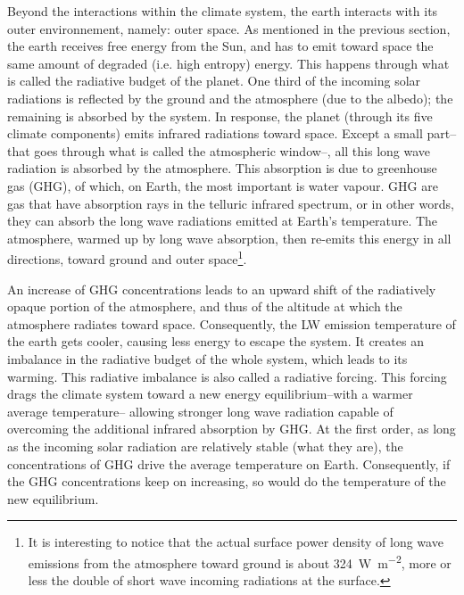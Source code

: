 
Beyond the interactions within the climate system, the earth interacts with its outer environnement, namely: outer space. As mentioned in the previous section, the earth receives free energy from the Sun, and has to emit toward space the same amount of degraded (i.e. high entropy) energy.
This happens through what is called the radiative budget of the planet.
One third of the incoming solar radiations is reflected by the ground and the atmosphere (due to the albedo); the remaining is absorbed by the system. 
In response, the planet (through its five climate components) emits infrared radiations toward space. Except a small part\---that goes through what is called the atmospheric window\---, all this long wave radiation is absorbed by the atmosphere.
This absorption is due to greenhouse gas (GHG), of which, on Earth, the most important is water vapour. GHG are gas that have absorption rays in the telluric infrared spectrum, or in other words, they can absorb the long wave radiations emitted at Earth's temperature.
The atmosphere, warmed up by long wave absorption, then re-emits this energy in all directions, toward ground and outer space\footnote{It is interesting to notice that the actual surface power density of long wave emissions from the atmosphere toward ground is about \SI{324}{\watt\per\square\meter}, more or less the double of short wave incoming radiations at the surface.}.

An increase of GHG concentrations leads to an upward shift of the radiatively opaque portion of the atmosphere, and thus of the altitude at which the atmosphere radiates toward space. Consequently, the LW emission temperature of the earth gets cooler, causing less energy to escape the system. It creates an imbalance in the radiative budget of the whole system, which leads to its warming. This radiative imbalance is also called a radiative forcing.  %
This forcing drags the climate system toward a new energy equilibrium\---with a warmer average temperature\--- allowing stronger long wave radiation capable of overcoming the additional infrared absorption by GHG.
At the first order, as long as the incoming solar radiation are relatively stable (what they are), the concentrations of GHG drive the average temperature on Earth.
Consequently, if the GHG concentrations keep on increasing, so would do the temperature of the new equilibrium.

